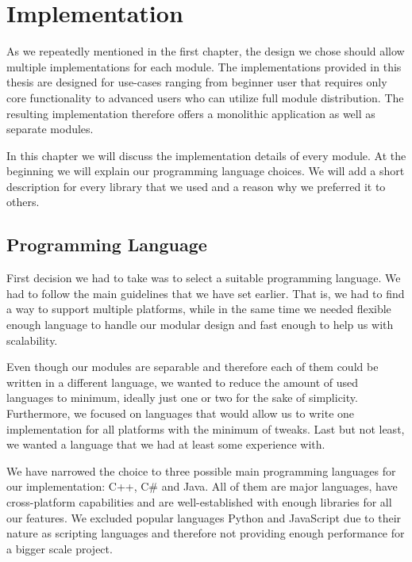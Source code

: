 \chapter{Implementation}

As we repeatedly mentioned in the first chapter, the design we chose should allow multiple implementations for each module. The implementations provided in this thesis are designed for use-cases ranging from beginner user that requires only core functionality to advanced users who can utilize full module distribution. The resulting implementation therefore offers a monolithic application as well as separate modules.
\par
In this chapter we will discuss the implementation details of every module. At the beginning we will explain our programming language choices. We will add a short description for every library that we used and a reason why we preferred it to others.

\section{Programming Language}

First decision we had to take was to select a suitable programming language. We had to follow the main guidelines that we have set earlier. That is, we had to find a way to support multiple platforms, while in the same time we needed flexible enough language to handle our modular design and fast enough to help us with scalability.
\par
Even though our modules are separable and therefore each of them could be written in a different language, we wanted to reduce the amount of used languages to minimum, ideally just one or two for the sake of simplicity. Furthermore, we focused on languages that would allow us to write one implementation for all platforms with the minimum of tweaks. Last but not least, we wanted a language that we had at least some experience with.
\par
We have narrowed the choice to three possible main programming languages for our implementation: C++, C\# and Java. All of them are major languages, have cross-platform capabilities and are well-established with enough libraries for all our features. We excluded popular languages Python and JavaScript due to their nature as scripting languages and therefore not providing enough performance for a bigger scale project.

